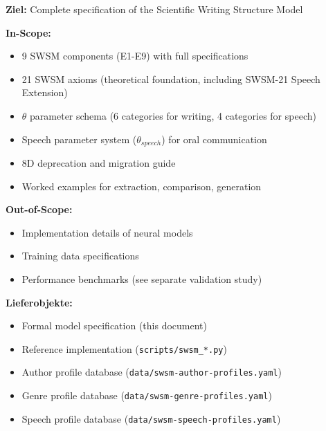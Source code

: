 \begin{tcolorbox}[colback=green!5!white, colframe=green!75!black, title=Appendix Scope]
\textbf{Ziel:} Complete specification of the Scientific Writing Structure Model

\textbf{In-Scope:}
\begin{itemize}
    \item 9 SWSM components (E1-E9) with full specifications
    \item 21 SWSM axioms (theoretical foundation, including SWSM-21 Speech Extension)
    \item $\theta$ parameter schema (6 categories for writing, 4 categories for speech)
    \item Speech parameter system ($\theta_{speech}$) for oral communication
    \item 8D deprecation and migration guide
    \item Worked examples for extraction, comparison, generation
\end{itemize}

\textbf{Out-of-Scope:}
\begin{itemize}
    \item Implementation details of neural models
    \item Training data specifications
    \item Performance benchmarks (see separate validation study)
\end{itemize}

\textbf{Lieferobjekte:}
\begin{itemize}
    \item Formal model specification (this document)
    \item Reference implementation (\texttt{scripts/swsm\_*.py})
    \item Author profile database (\texttt{data/swsm-author-profiles.yaml})
    \item Genre profile database (\texttt{data/swsm-genre-profiles.yaml})
    \item Speech profile database (\texttt{data/swsm-speech-profiles.yaml})
\end{itemize}
\end{tcolorbox}



